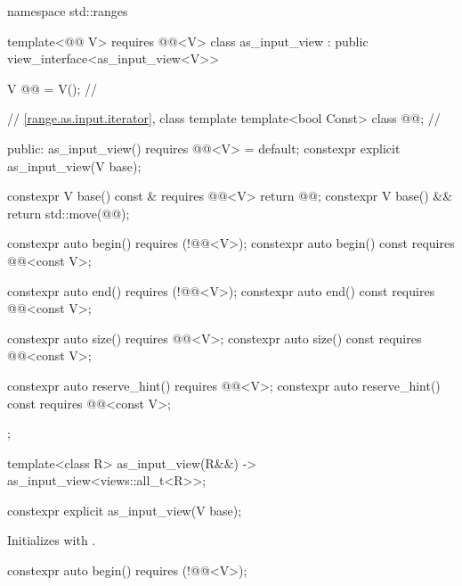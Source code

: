 %
\begin{codeblock}
namespace std::ranges {
  template<@@ V>
    requires @@<V>
  class as_input_view : public view_interface<as_input_view<V>> {
    V @@ = V();                        // \expos

    // \ref{range.as.input.iterator}, class template 
    template<bool Const> class @@;  // \expos

  public:
    as_input_view() requires @@<V> = default;
    constexpr explicit as_input_view(V base);

    constexpr V base() const & requires @@<V> { return @@; }
    constexpr V base() && { return std::move(@@); }

    constexpr auto begin() requires (!@@<V>);
    constexpr auto begin() const requires @@<const V>;

    constexpr auto end() requires (!@@<V>);
    constexpr auto end() const requires @@<const V>;

    constexpr auto size() requires @@<V>;
    constexpr auto size() const requires @@<const V>;

    constexpr auto reserve_hint() requires @@<V>;
    constexpr auto reserve_hint() const requires @@<const V>;
  };

  template<class R>
    as_input_view(R&&) -> as_input_view<views::all_t<R>>;
}
\end{codeblock}

%
\begin{itemdecl}
constexpr explicit as_input_view(V base);
\end{itemdecl}

\begin{itemdescr}
\pnum
\effects
Initializes  with .
\end{itemdescr}

%
\begin{itemdecl}
constexpr auto begin() requires (!@@<V>);
\end{itemdecl}

